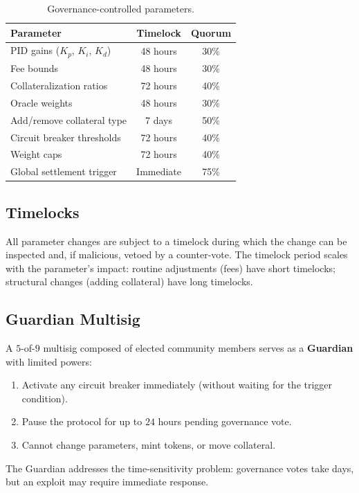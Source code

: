 \documentclass[11pt,a4paper]{article}
\begin{document}
\begin{table}[H]
\centering
\caption{Governance-controlled parameters.}
\label{tab:gov_params}
\begin{tabular}{@{}lcc@{}}
\toprule
\textbf{Parameter} & \textbf{Timelock} & \textbf{Quorum} \\
\midrule
PID gains ($K_p$, $K_i$, $K_d$) & 48 hours & 30\% \\
Fee bounds & 48 hours & 30\% \\
Collateralization ratios & 72 hours & 40\% \\
Oracle weights & 48 hours & 30\% \\
Add/remove collateral type & 7 days & 50\% \\
Circuit breaker thresholds & 72 hours & 40\% \\
Weight caps & 72 hours & 40\% \\
Global settlement trigger & Immediate & 75\% \\
\bottomrule
\end{tabular}
\end{table}

\subsection{Timelocks}

All parameter changes are subject to a timelock during which the change can be inspected and, if malicious, vetoed by a counter-vote.
The timelock period scales with the parameter's impact: routine adjustments (fees) have short timelocks; structural changes (adding collateral) have long timelocks.

\subsection{Guardian Multisig}

A $5$-of-$9$ multisig composed of elected community members serves as a \textbf{Guardian} with limited powers:

\begin{enumerate}
  \item Activate any circuit breaker immediately (without waiting for the trigger condition).
  \item Pause the protocol for up to $24$ hours pending governance vote.
  \item Cannot change parameters, mint tokens, or move collateral.
\end{enumerate}

The Guardian addresses the time-sensitivity problem: governance votes take days, but an exploit may require immediate response.
\end{document}
